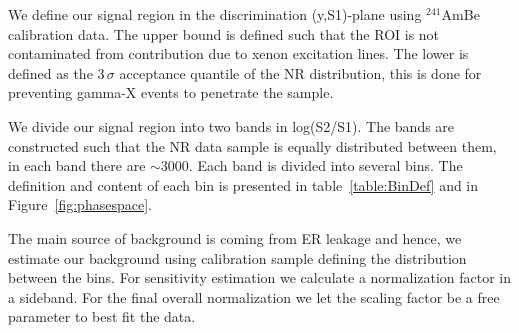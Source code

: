 We define our signal region in the discrimination (y,S1)-plane using $^{241}$AmBe calibration data. The upper bound is defined such that the ROI is not contaminated from contribution due to xenon excitation lines.
The lower is defined as the 3\,$\sigma$ acceptance quantile of the NR distribution, this is done for preventing gamma-X events to penetrate the sample.

We divide our signal region into two bands in log(S2/S1). The bands are constructed such that the NR data sample is equally distributed between them, in each band there are $\sim3000$. Each band is divided into several bins. The definition and content of each bin is presented in table~\ref{table:BinDef} and in Figure~\ref{fig:phasespace}. 



The main source of background is coming from ER leakage and hence, we estimate our background using calibration sample defining the distribution between the bins. 
For sensitivity estimation we calculate a normalization factor in a sideband. For the final overall normalization we let the scaling factor be a free parameter to best fit the data.


